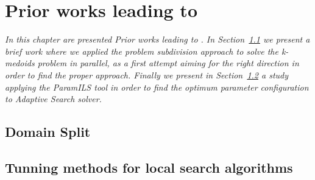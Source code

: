 \chapter{Prior works leading to \posl}
\label{chap:prior}
\textit{In this chapter are presented Prior works leading to \posl. In Section~\ref{sec:split} we present a brief work where we applied the {\it problem subdivision} approach to solve the {\it k-medoids problem} in parallel, as a first attempt aiming for the right direction in order to find the proper approach. Finally we present in Section~\ref{sec:paramils} a study applying the {\sc ParamILS} tool in order to find the optimum parameter configuration to {\it Adaptive Search} solver.}

\vspace{2ex}\vfill
\minitoc
\newpage



%

\section{Domain Split}
\label{sec:split}




\section{Tunning methods for local search algorithms}
\label{sec:paramils}

